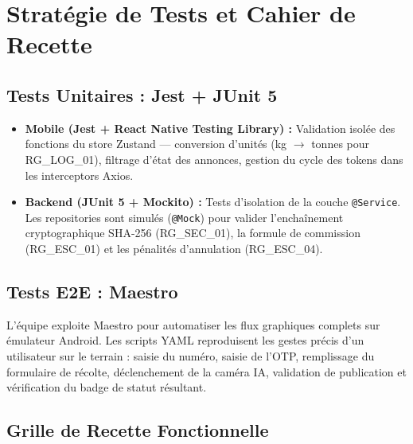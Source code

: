 \documentclass[12pt,a4paper]{report}
\begin{document}
\section{Stratégie de Tests et Cahier de Recette}

\subsection{Tests Unitaires : Jest + JUnit 5}

\begin{itemize}
  \item \textbf{Mobile (Jest + React Native Testing Library) :} Validation isolée des fonctions du store Zustand — conversion d'unités (kg $\to$ tonnes pour RG\_LOG\_01), filtrage d'état des annonces, gestion du cycle des tokens dans les interceptors Axios.
  \item \textbf{Backend (JUnit 5 + Mockito) :} Tests d'isolation de la couche \texttt{@Service}. Les repositories sont simulés (\texttt{@Mock}) pour valider l'enchaînement cryptographique SHA-256 (RG\_SEC\_01), la formule de commission (RG\_ESC\_01) et les pénalités d'annulation (RG\_ESC\_04).
\end{itemize}

\subsection{Tests E2E : Maestro}

L'équipe exploite Maestro pour automatiser les flux graphiques complets sur émulateur Android. Les scripts YAML reproduisent les gestes précis d'un utilisateur sur le terrain : saisie du numéro, saisie de l'OTP, remplissage du formulaire de récolte, déclenchement de la caméra IA, validation de publication et vérification du badge de statut résultant.

\subsection{Grille de Recette Fonctionnelle}
\end{document}
